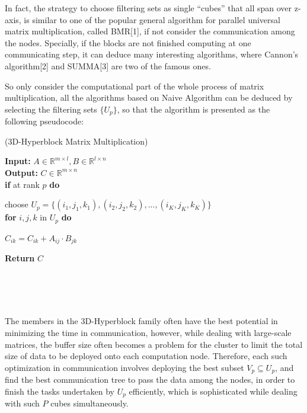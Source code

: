 \documentclass{amsart}
\theoremstyle{definition}
\theoremstyle{remark}
\numberwithin{equation}{section}
\begin{document}
\par
	In fact, the strategy to choose filtering sets as single “cubes” that all span over z-axis, is similar to one of the popular general algorithm for parallel universal matrix multiplication, called BMR[1], if not consider the communication among the nodes. Specially, if the blocks are not finished computing at one communicating step, it can deduce many interesting algorithms, where Cannon’s algorithm[2] and SUMMA[3] are two of the famous ones.\par
	So only consider the computational part of the whole process of matrix multiplication, all the algorithms based on Naive Algorithm can be deduced by selecting the filtering sets $\{U_p\}$, so that the algorithm is presented as the following pseudocode:\par

\begin{algorithm}[h] 
\caption{(3D-Hyperblock Matrix Multiplication)}
\begin{adjustwidth}{0cm}{1cm} 
\textbf{Input:} $A\in \mathbb{R}^{m\times l},B\in \mathbb{R}^{l\times n}$\\
\textbf{Output:} $C\in \mathbb{R}^{m\times n}$\\
\textbf{if} at rank $p$\textbf{ do}\\
\end{adjustwidth}
	\begin{adjustwidth}{1cm}{1cm}
	choose $U_p=\{(i_1,j_1,k_1),(i_2,j_2,k_2),...,(i_K,j_K,k_K)\}$\\
	\textbf{for} $i,j,k$ in $U_p$ \textbf{ do}
	\end{adjustwidth}
		\begin{adjustwidth}{2cm}{1cm}
		$C_{ik}=C_{ik}+A_{ij}\cdot B_{jk}$\\
		\end{adjustwidth}
\begin{adjustwidth}{0cm}{1cm} 
\textbf{Return } $C$\\
\end{adjustwidth}
\end{algorithm}
~\\~\\~\\
\par
	The members in the 3D-Hyperblock family often have the best potential in minimizing the time in communication, however, while dealing with large-scale matrices, the buffer size often becomes a problem for the cluster to limit the total size of data to be deployed onto each computation node. Therefore, each such optimization in communication involves deploying the best subset $V_p\subseteq U_p$, and find the best communication tree to pass the data among the nodes, in order to finish the tasks undertaken by $U_p$ efficiently, which is sophisticated while dealing with such $P$ cubes simultaneously.\par
\end{document}
